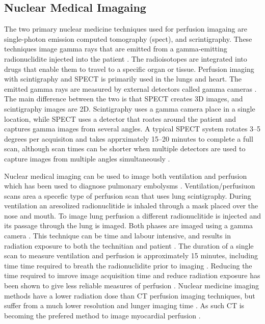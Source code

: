 \subsection{Nuclear Medical Imagaing}
The two primary nuclear medicine techniques used for perfusion imagaing are 
single-photon emission computed tomography (\acrshort{spect}), and scrintigraphy. 
These techniques image gamma rays that are emitted from a gamma-emitting radionuclidite
injected into the patient \parencite{mettler_essentials_2006}. 
The radioisotopes are integrated into drugs 
that enable them to travel to a specific organ or tissue. 
Perfusion imaging with scintigraphy and SPECT 
is primarily used in the lungs and heart. 
The emitted gamma rays are measured by external detectors called 
gamma cameras \parencite{mettler_essentials_2006}. 
The main difference between the two is that SPECT creates 3D images, and 
scintigraphy images are 2D.
Scintigraphy uses a gamma camera place in a single location, while SPECT 
uses a detector that roates around the patient and captures gamma images from 
several angles. A typical SPECT system rotates 3--5 degrees per acquisiton 
and takes apprximately 15--20 minutes to complete a full scan,
although scan times can be shorter when multiple detectors are used to capture
images from multiple angles simultaneously \parencite{mettler_essentials_2006}.

Nuclear medical imaging can be used to image both ventilation and perfusion which 
has been used to diagnose pulmonary embolysms \parencite{mortensen_lung_2019}.
Ventilation/perfusiuon scans area a specefic type of perfusion scan that uses lung
scintigraphy. During ventilation an aresolized radionuclitide is inhaled through a mask placed
over the nose and mouth. To image lung perfusion a different radionuclitide 
is injected and its passage through 
the lung is imaged.
Both phases are imaged using a gamma camera \parencite{mortensen_lung_2019}. 
This technique can be time and labour intensive, and results in 
radiation exposure to both the technitian and patient \parencite{gandev_comparison_2005}.
The duration of a single scan to measure ventilation and  
perfusion is approximately 15 minutes, including time time required to breath the radionuclidite
prior to imaging \parencite{hur_optimizing_2014}. Reducing the time 
required to imrove image acquisition time and reduce radiation exposure
has been shown to give less reliable measures of perfusion \parencite{hur_optimizing_2014}.
Nuclear medicine imaging methods have a lower radiation dose than CT perfusion imaging techniques,
but suffer from a much lower resolution and lunger imaging time \parencite{aljizeeri_ct_2013}. 
As such CT is becoming the prefered 
method to image myocardial perfusion \parencite{aljizeeri_ct_2013}. 

